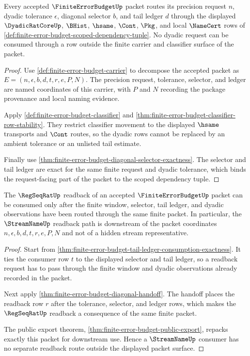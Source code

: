 \begin{theorem}
\label{thm:finite-error-budget-dyadic-request-scope}
Every accepted $\FiniteErrorBudgetUp$ packet routes its precision request
$n$, dyadic tolerance $\epsilon$, diagonal selector $b$, and tail ledger $d$
through the displayed $\DyadicRatCoreUp$, $\BHist$, $\hsame$, $\Cont$, $\Pkg$,
and local $\NameCert$ rows of
\autoref{def:finite-error-budget-scoped-dependency-tuple}. No dyadic request
can be consumed through a row outside the finite carrier and classifier
surface of the packet.
\end{theorem}
\begin{proof}
Use \autoref{def:finite-error-budget-carrier} to decompose the accepted packet
as $E=(n,\epsilon,b,d,t,r,e,P,N)$. The precision request, tolerance, selector,
and ledger are named coordinates of this carrier, with $P$ and $N$ recording
the package provenance and local naming evidence.

Apply \autoref{def:finite-error-budget-classifier} and
\autoref{thm:finite-error-budget-classifier-row-stability}. They restrict
classifier movement to the displayed $\hsame$ transports and $\Cont$ routes,
so the dyadic rows cannot be replaced by an ambient tolerance or an unlisted
tail estimate.

Finally use
\autoref{thm:finite-error-budget-diagonal-selector-exactness}. The selector
and tail ledger are exact for the same finite request and dyadic tolerance,
which binds the request-facing part of the packet to the scoped dependency
tuple.
\end{proof}

\begin{theorem}
\label{thm:finite-error-budget-streamname-readback-scope}
The $\RegSeqRatUp$ readback of an accepted $\FiniteErrorBudgetUp$ packet can
be consumed only after the finite window, selector, tail ledger, and dyadic
observations have been routed through the same finite packet. In particular,
the $\StreamNameUp$ readback path is downstream of the packet coordinates
$n,\epsilon,b,d,t,r,e,P,N$ and not of a hidden stream representative.
\end{theorem}
\begin{proof}
Start from
\autoref{thm:finite-error-budget-tail-ledger-consumption-exactness}. It ties
the consumer row $t$ to the displayed selector and tail ledger, so a readback
request has to pass through the finite window and dyadic observations already
recorded in the packet.

Next apply \autoref{thm:finite-error-budget-diagonal-handoff}. The handoff
places the readback row $r$ after the tolerance, selector, and ledger rows,
which makes the $\RegSeqRatUp$ readback a consequence of the same finite
packet.

The public export theorem,
\autoref{thm:finite-error-budget-public-export}, repacks exactly this packet
for downstream use. Hence a $\StreamNameUp$ consumer has no separate readback
route outside the displayed packet surface.
\end{proof}

